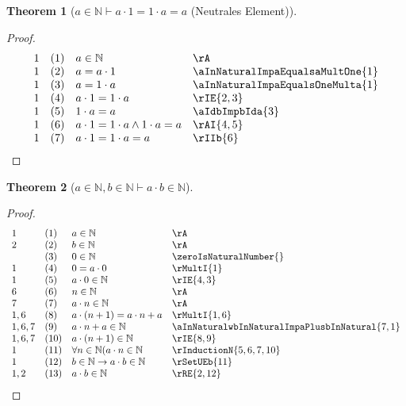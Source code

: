 \documentclass{book}
\theoremstyle{plain}
\newtheorem{theorem}{Theorem}
\theoremstyle{remark}
\theoremstyle{definition}
\begin{document}
\label{aInNaturalImpaMultOneEqualsOneMultaEqualsa}
\begin{theorem}[\(a\in\mathbb{N}\vdash a\cdot 1=1\cdot a = a\) (Neutrales Element)]
\end{theorem}
\begin{proof}
        \[
	\begin{array}{llll}
            1   &  (1) & a\in\mathbb{N} & \rA \\
            1   &  (2) & a=a\cdot 1 & \aInNaturalImpaEqualsaMultOne{1} \\
            1   &  (3) & a=1\cdot a & \aInNaturalImpaEqualsOneMulta{1} \\
            1   &  (4) & a\cdot 1=1\cdot a & \rIE{2,3} \\
            1   &  (5) & 1\cdot a=a & \aIdbImpbIda{3} \\
            1   &  (6) & a\cdot 1=1\cdot a\land 1\cdot a=a & \rAI{4,5} \\
            1   &  (7) & a\cdot 1=1\cdot a = a & \rIIb{6} \\
	\end{array}
	\]
\end{proof}

\label{aInNaturalwbInNaturalImpaMultbInNatural}
\begin{theorem}[\(a\in\mathbb{N},b\in\mathbb{N}\vdash a\cdot b\in\mathbb{N}\)]
\end{theorem}
\begin{proof}
        \[
	\begin{array}{llll}
            1         &  (1) & a\in\mathbb{N} & \rA \\
            2         &  (2) & b\in\mathbb{N} & \rA \\
                      &  (3) & 0\in\mathbb{N} & \zeroIsNaturalNumber{} \\            
            1         &  (4) & 0=a\cdot 0 & \rMultI{1} \\
            1         &  (5) & a\cdot 0\in\mathbb{N} & \rIE{4,3} \\
            6         &  (6) & n\in\mathbb{N} & \rA \\
            7         &  (7) & a\cdot n\in\mathbb{N} & \rA \\
            1,6       &  (8) & a\cdot (n+1) = a\cdot n+a & \rMultI{1,6} \\
            1,6,7     &  (9) & a\cdot n+a\in\mathbb{N} & \aInNaturalwbInNaturalImpaPlusbInNatural{7,1} \\
            1,6,7     &  (10) & a\cdot (n+1)\in\mathbb{N} & \rIE{8,9} \\
            1     &  (11) & \forall n\in\mathbb{N}(a\cdot n\in\mathbb{N} & \rInductionN{5,6,7,10} \\
            1     &  (12) & b\in\mathbb{N}\rightarrow a\cdot b\in\mathbb{N} & \rSetUEb{11} \\
            1,2     &  (13) & a\cdot b\in\mathbb{N} & \rRE{2,12} \\            
	\end{array}
	\]
\end{proof}
\end{document}
